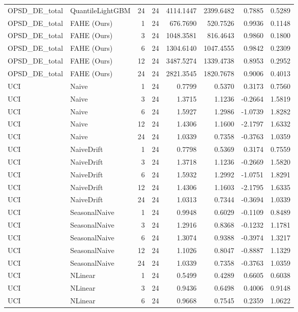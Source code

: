 \begin{tabular}{llrrrrrr}
OPSD_DE_total & QuantileLightGBM & 24 & 24 & 4114.1447 & 2399.6482 & 0.7885 & 0.5289 \\
OPSD_DE_total & FAHE (Ours) & 1 & 24 & 676.7690 & 520.7526 & 0.9936 & 0.1148 \\
OPSD_DE_total & FAHE (Ours) & 3 & 24 & 1048.3581 & 816.4643 & 0.9860 & 0.1800 \\
OPSD_DE_total & FAHE (Ours) & 6 & 24 & 1304.6140 & 1047.4555 & 0.9842 & 0.2309 \\
OPSD_DE_total & FAHE (Ours) & 12 & 24 & 3487.5274 & 1339.4738 & 0.8953 & 0.2952 \\
OPSD_DE_total & FAHE (Ours) & 24 & 24 & 2821.3545 & 1820.7678 & 0.9006 & 0.4013 \\
UCI & Naive & 1 & 24 & 0.7799 & 0.5370 & 0.3173 & 0.7560 \\
UCI & Naive & 3 & 24 & 1.3715 & 1.1236 & -0.2664 & 1.5819 \\
UCI & Naive & 6 & 24 & 1.5927 & 1.2986 & -1.0739 & 1.8282 \\
UCI & Naive & 12 & 24 & 1.4306 & 1.1600 & -2.1797 & 1.6332 \\
UCI & Naive & 24 & 24 & 1.0339 & 0.7358 & -0.3763 & 1.0359 \\
UCI & NaiveDrift & 1 & 24 & 0.7798 & 0.5369 & 0.3174 & 0.7559 \\
UCI & NaiveDrift & 3 & 24 & 1.3718 & 1.1236 & -0.2669 & 1.5820 \\
UCI & NaiveDrift & 6 & 24 & 1.5932 & 1.2992 & -1.0751 & 1.8291 \\
UCI & NaiveDrift & 12 & 24 & 1.4306 & 1.1603 & -2.1795 & 1.6335 \\
UCI & NaiveDrift & 24 & 24 & 1.0313 & 0.7344 & -0.3694 & 1.0339 \\
UCI & SeasonalNaive & 1 & 24 & 0.9948 & 0.6029 & -0.1109 & 0.8489 \\
UCI & SeasonalNaive & 3 & 24 & 1.2916 & 0.8368 & -0.1232 & 1.1781 \\
UCI & SeasonalNaive & 6 & 24 & 1.3074 & 0.9388 & -0.3974 & 1.3217 \\
UCI & SeasonalNaive & 12 & 24 & 1.1026 & 0.8047 & -0.8887 & 1.1329 \\
UCI & SeasonalNaive & 24 & 24 & 1.0339 & 0.7358 & -0.3763 & 1.0359 \\
UCI & NLinear & 1 & 24 & 0.5499 & 0.4289 & 0.6605 & 0.6038 \\
UCI & NLinear & 3 & 24 & 0.9436 & 0.6498 & 0.4006 & 0.9148 \\
UCI & NLinear & 6 & 24 & 0.9668 & 0.7545 & 0.2359 & 1.0622 \\

\end{tabular}
